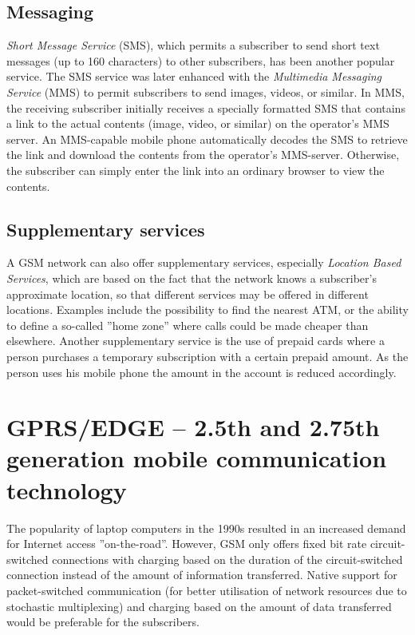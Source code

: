 \subsection{Messaging}
\emph{Short Message Service} (SMS), which permits a subscriber to send short text messages (up to 160 characters) to other subscribers, has been another popular service. The SMS service was later enhanced with the \emph{Multimedia Messaging Service} (MMS) to permit subscribers to send images, videos, or similar. In MMS, the receiving subscriber initially receives a specially formatted SMS that contains a link to the actual contents (image, video, or similar) on the operator's MMS server. An MMS-capable mobile phone automatically decodes the SMS to retrieve the link and download the contents from the operator's MMS-server. Otherwise, the subscriber can simply enter the link into an ordinary browser to view the contents.

\subsection{Supplementary services}
A GSM network can also offer supplementary services, especially \emph{Location Based Services}, which are based on the fact that the network knows a subscriber's approximate location, so that different services may be offered in different locations. Examples include the possibility to find the nearest ATM, or the ability to define a so-called ''home zone'' where calls could be made cheaper than elsewhere. Another supplementary service is the use of prepaid cards where a person purchases a temporary subscription with a certain prepaid amount. As the person uses his mobile phone the amount in the account is reduced accordingly.

\section{GPRS/EDGE -- 2.5th and 2.75th generation mobile communication technology}
The popularity of laptop computers in the 1990s resulted in an increased demand for Internet access ''on-the-road''. However, GSM only offers fixed bit rate circuit-switched connections with charging based on the duration of the circuit-switched connection instead of the amount of information transferred. Native support for packet-switched communication (for better utilisation of network resources due to stochastic multiplexing) and charging based on the amount of data transferred would be preferable for the subscribers.


